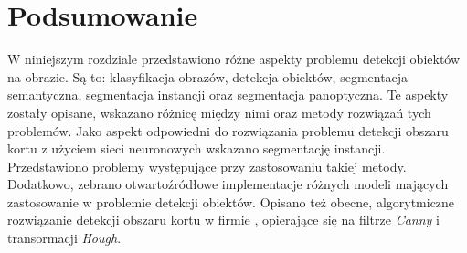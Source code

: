 \section{Podsumowanie}
W niniejszym rozdziale przedstawiono różne aspekty problemu detekcji obiektów na obrazie.
Są to: klasyfikacja obrazów, detekcja obiektów, segmentacja semantyczna, segmentacja instancji oraz segmentacja panoptyczna.
Te aspekty zostały opisane, wskazano różnicę między nimi oraz metody rozwiązań tych problemów.
Jako aspekt odpowiedni do rozwiązania problemu detekcji obszaru kortu z użyciem sieci neuronowych wskazano segmentację instancji.
Przedstawiono problemy występujące przy zastosowaniu takiej metody.
Dodatkowo, zebrano otwartoźródłowe implementacje różnych modeli mających zastosowanie w problemie detekcji obiektów.
Opisano też obecne, algorytmiczne rozwiązanie detekcji obszaru kortu w firmie \blue{}, opierające się na filtrze \textit{Canny} i transormacji \textit{Hough}.
